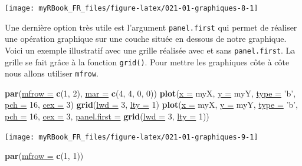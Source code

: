 \documentclass[twoside,symmetric]{book}
\newenvironment{Shaded}{}{}
\newcommand{\DataTypeTok}[1]{\underline{#1}}
\newcommand{\DecValTok}[1]{#1}
\newcommand{\KeywordTok}[1]{\textbf{#1}}
\newcommand{\NormalTok}[1]{#1}
\newcommand{\StringTok}[1]{#1}
\begin{document}
\texttt{[image: myRBook\_FR\_files/figure-latex/021-01-graphiques-8-1]}

Une dernière option très utile est l'argument \texttt{panel.first} qui permet de réaliser une opération graphique sur une couche située en dessous de notre graphique. Voici un exemple illustratif avec une grille réalisée avec et sans \texttt{panel.first}. La grille se fait grâce à la fonction \texttt{grid()}. Pour mettre les graphiques côte à côte nous allons utiliser \texttt{mfrow}.

\begin{Shaded}
\begin{Highlighting}[]
\KeywordTok{par}\NormalTok{(}\DataTypeTok{mfrow =} \KeywordTok{c}\NormalTok{(}\DecValTok{1}\NormalTok{, }\DecValTok{2}\NormalTok{), }\DataTypeTok{mar =} \KeywordTok{c}\NormalTok{(}\DecValTok{4}\NormalTok{, }\DecValTok{4}\NormalTok{, }\DecValTok{0}\NormalTok{, }\DecValTok{0}\NormalTok{))}
\KeywordTok{plot}\NormalTok{(}\DataTypeTok{x =}\NormalTok{ myX, }\DataTypeTok{y =}\NormalTok{ myY, }
  \DataTypeTok{type =} \StringTok{'b'}\NormalTok{, }\DataTypeTok{pch =} \DecValTok{16}\NormalTok{, }\DataTypeTok{cex =} \DecValTok{3}\NormalTok{) }
\KeywordTok{grid}\NormalTok{(}\DataTypeTok{lwd =} \DecValTok{3}\NormalTok{, }\DataTypeTok{lty =} \DecValTok{1}\NormalTok{)}
\KeywordTok{plot}\NormalTok{(}\DataTypeTok{x =}\NormalTok{ myX, }\DataTypeTok{y =}\NormalTok{ myY, }
  \DataTypeTok{type =} \StringTok{'b'}\NormalTok{, }\DataTypeTok{pch =} \DecValTok{16}\NormalTok{, }\DataTypeTok{cex =} \DecValTok{3}\NormalTok{, }
  \DataTypeTok{panel.first =} \KeywordTok{grid}\NormalTok{(}\DataTypeTok{lwd =} \DecValTok{3}\NormalTok{, }\DataTypeTok{lty =} \DecValTok{1}\NormalTok{)) }
\end{Highlighting}
\end{Shaded}

\texttt{[image: myRBook\_FR\_files/figure-latex/021-01-graphiques-9-1]}

\begin{Shaded}
\begin{Highlighting}[]
\KeywordTok{par}\NormalTok{(}\DataTypeTok{mfrow =} \KeywordTok{c}\NormalTok{(}\DecValTok{1}\NormalTok{, }\DecValTok{1}\NormalTok{))}
\end{Highlighting}
\end{Shaded}
\end{document}

